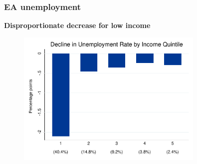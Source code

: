 \documentclass[pdflatex,aspectratio=169]{beamer}
\newcommand{\jbemph}[1]{\textbf{\color{SlideNavy}#1}}
\begin{document}

\begin{frame}\frametitle{\bf EA unemployment}
\jbemph{Disproportionate decrease for low income}

\begin{figure}
\begin{center}
\includegraphics[width=0.8\textwidth]{./figures/urChangeByIncQuint_EA.pdf}
\end{center}
\end{figure}
\end{frame}
\end{document}
